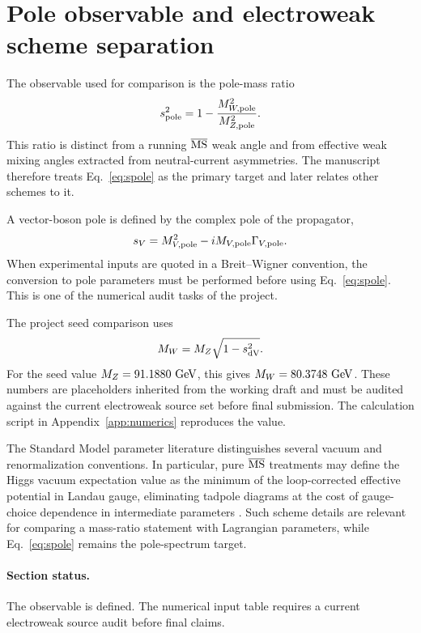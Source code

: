 \section{Pole observable and electroweak scheme separation}
\label{sec:pole}

The observable used for comparison is the pole-mass ratio
\begin{equation}
  s^2_{\rm pole} = 1-\frac{M_{W,\rm pole}^2}{M_{Z,\rm pole}^2}.
  \label{eq:spole}
\end{equation}
This ratio is distinct from a running \(\overline{\mathrm{MS}}\) weak angle and from effective weak mixing angles extracted from neutral-current asymmetries.  The manuscript therefore treats Eq.~\eqref{eq:spole} as the primary target and later relates other schemes to it.

A vector-boson pole is defined by the complex pole of the propagator,
\begin{equation}
  s_V=M_{V,\rm pole}^2-iM_{V,\rm pole}\Gamma_{V,\rm pole}.
  \label{eq:complex-pole}
\end{equation}
When experimental inputs are quoted in a Breit--Wigner convention, the conversion to pole parameters must be performed before using Eq.~\eqref{eq:spole}.  This is one of the numerical audit tasks of the project.

The project seed comparison uses
\begin{equation}
  M_W=M_Z\sqrt{1-s^2_{\rm dV}}.
  \label{eq:MWfromMZ}
\end{equation}
For the seed value \(M_Z=91.1880\,\,\mathrm{GeV}\), this gives \(M_W=80.3748\,\,\mathrm{GeV}\).  These numbers are placeholders inherited from the working draft and must be audited against the current electroweak source set before final submission.  The calculation script in Appendix~\ref{app:numerics} reproduces the value.

The Standard Model parameter literature distinguishes several vacuum and renormalization conventions.  In particular, pure \(\overline{\mathrm{MS}}\) treatments may define the Higgs vacuum expectation value as the minimum of the loop-corrected effective potential in Landau gauge, eliminating tadpole diagrams at the cost of gauge-choice dependence in intermediate parameters \cite{MartinRobertson2025}.  Such scheme details are relevant for comparing a mass-ratio statement with Lagrangian parameters, while Eq.~\eqref{eq:spole} remains the pole-spectrum target.

\paragraph*{Section status.}  The observable is defined.  The numerical input table requires a current electroweak source audit before final claims.
